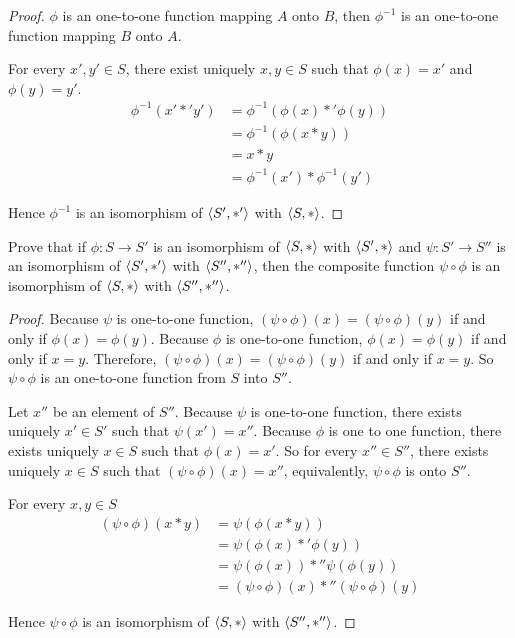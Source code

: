 \begin{proof}
    $\phi$ is an one-to-one function mapping $A$ onto $B$, then $\phi^{-1}$ is an one-to-one function mapping $B$ onto $A$.

    For every $x', y'\in S$, there exist uniquely $x, y\in S$ such that $\phi(x) = x'$ and $\phi(y) = y'$.
    \begin{align*}
        \phi^{-1}(x' *' y') & = \phi^{-1}(\phi(x) *' \phi(y)) \\
                            & = \phi^{-1}(\phi(x * y))        \\
                            & = x * y                         \\
                            & = \phi^{-1}(x') * \phi^{-1}(y')
    \end{align*}

    Hence $\phi^{-1}$ is an isomorphism of $\left\langle{S', *'}\right\rangle$ with $\left\langle{S, *}\right\rangle$.
\end{proof}

\begin{exercise}
    Prove that if $\phi: S \to S'$ is an isomorphism of $\left\langle{S, *}\right\rangle$ with $\left\langle{S', *}\right\rangle$ and $\psi: S' \to S''$ is an isomorphism of $\left\langle{S', *'}\right\rangle$ with $\left\langle{S'', *''}\right\rangle$, then the composite function $\psi\circ\phi$ is an isomorphism of $\left\langle{S, *}\right\rangle$ with $\left\langle{S'', *''}\right\rangle$.
\end{exercise}

\begin{proof}
    Because $\psi$ is one-to-one function, $(\psi\circ\phi)(x) = (\psi\circ\phi)(y)$ if and only if $\phi(x) = \phi(y)$. Because $\phi$ is one-to-one function, $\phi(x) = \phi(y)$ if and only if $x = y$. Therefore, $(\psi\circ\phi)(x) = (\psi\circ\phi)(y)$ if and only if $x = y$. So $\psi\circ\phi$ is an one-to-one function from $S$ into $S''$.

    Let $x''$ be an element of $S''$. Because $\psi$ is one-to-one function, there exists uniquely $x'\in S'$ such that $\psi(x') = x''$. Because $\phi$ is one to one function, there exists uniquely $x\in S$ such that $\phi(x) = x'$. So for every $x''\in S''$, there exists uniquely $x\in S$ such that $(\psi\circ\phi)(x) = x''$, equivalently, $\psi\circ\phi$ is onto $S''$.

    For every $x, y\in S$
    \begin{align*}
        (\psi\circ\phi)(x * y) & = \psi(\phi(x * y))                         \\
                               & = \psi(\phi(x) *' \phi(y))                  \\
                               & = \psi(\phi(x)) *'' \psi(\phi(y))           \\
                               & = (\psi\circ\phi)(x) *'' (\psi\circ\phi)(y)
    \end{align*}

    Hence $\psi\circ\phi$ is an isomorphism of $\left\langle{S, *}\right\rangle$ with $\left\langle{S'', *''}\right\rangle$.
\end{proof}

